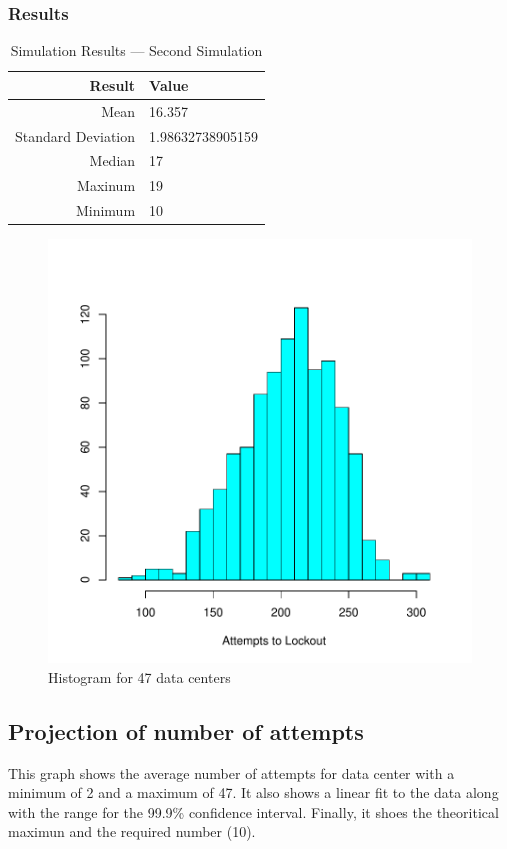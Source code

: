 \documentclass[11pt, letterpaper]{article}
\begin{document}
\subsubsection*{Results}
\begin{table}[H]
	\centering
	\caption{Simulation Results --- Second Simulation}
	\begin{tabular}{||r|l||}
		\hline \hline
		Result                  & Value                     \\ \hline \hline
		Mean                    & 16.357    \\ \hline
		Standard Deviation      & 1.98632738905159    \\ \hline
		Median                  & 17    \\ \hline
		Maxinum                 & 19    \\ \hline
		Minimum                 & 10    \\ \hline \hline
	\end{tabular}
	\label{tab:Sim2_res}
\end{table}

\begin{figure}[H]
\centering
\includegraphics{Report-005}
	\caption{Histogram for 47 data centers}
	\label{fig:hist_2}
\end{figure}

\subsection{Projection of number of attempts}
This graph shows the average number of attempts for data center
with a minimum of 2 and a maximum of 47. It also shows a linear
fit to the data along with the range for the 99.9\% confidence interval. Finally,
it shoes the theoritical maximun and the required number (10).
\end{document}
